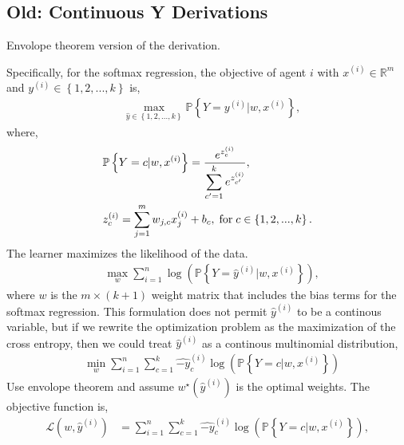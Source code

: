 \documentclass{article}
\begin{document}
\subsection{Old: Continuous Y Derivations}
\begin{tcolorbox}[colback = white]
Envolope theorem version of the derivation.
\end{tcolorbox}
Specifically, for the softmax regression, the objective of agent $i $ with $x^{\left(i\right)} \in \mathbb{R}^{m}$ and $y^{\left(i\right)} \in \left\{1, 2, ..., k \right\}$ is,
\begin{align*}
&  \displaystyle\max_{\hat{y} \in \left\{1, 2, ..., k \right\}} \mathbb{P}\left\{Y = y^{\left(i\right)} | w, x^{\left(i\right)}\right\},
\end{align*}
where,
\begin{align*}
&  \mathbb{P}\left\{Y = c | w, x^{\left(i\right)}\right\} = \dfrac{e^{z_{c}^{\left(i\right)}}}{\displaystyle\sum_{c'=1}^{k} e^{z_{c'}^{\left(i\right)}}},
\\ &  z_{c}^{\left(i\right)} = \displaystyle\sum_{j=1}^{m} w_{j,c} x_{j}^{\left(i\right)} + b_{c} , \text{\;for\;} c \in \left\{1, 2, ..., k\right\}.
\end{align*}
The learner maximizes the likelihood of the data.
\begin{align*}
&\displaystyle\max_{w} \displaystyle\sum_{i=1}^{n} \log\left(\mathbb{P}\left\{Y = \hat{y} ^{\left(i\right)} | w, x^{\left(i\right)}\right\}\right),
\end{align*}
where $w $ is the $m  \times \left(k  + 1\right)$ weight matrix that includes the bias terms for the softmax regression.
\newline \newline
This formulation does not permit $\hat{y} ^{\left(i\right)}$ to be a continous variable, but if we rewrite the optimization problem as the maximization of the cross entropy, then we could treat $\hat{y} ^{\left(i\right)}$ as a continous multinomial distribution,
\begin{align*}
&\displaystyle\min_{w} \displaystyle\sum_{i=1}^{n} \displaystyle\sum_{c=1}^{k} \hat{-y}_{c}^{\left(i\right)} \log\left(\mathbb{P}\left\{Y = c | w, x^{\left(i\right)}\right\}\right)
\end{align*}
Use envolope theorem and assume $w^\star \left(\hat{y} ^{\left(i\right)}\right)$ is the optimal weights. The objective function is,
\begin{align*}
\mathcal{L}\left(w, \hat{y} ^{\left(i\right)}\right) &= \displaystyle\sum_{i=1}^{n} \displaystyle\sum_{c=1}^{k} \hat{-y}_{c}^{\left(i\right)} \log\left(\mathbb{P}\left\{Y = c | w, x^{\left(i\right)}\right\}\right),
\end{align*}
\end{document}
